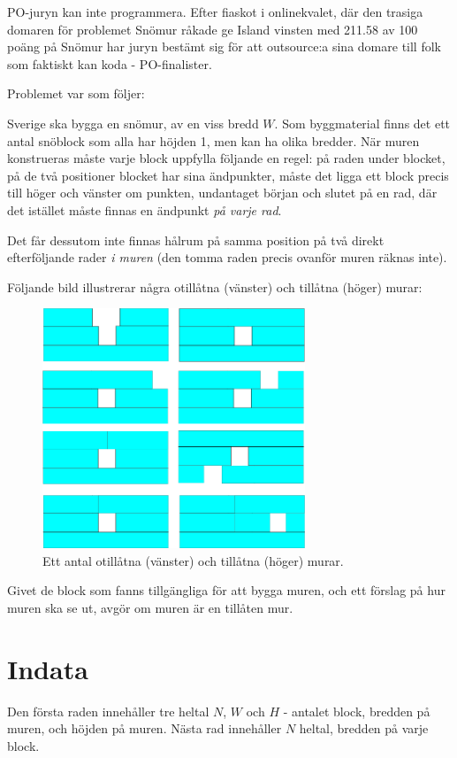 PO-juryn kan inte programmera. Efter fiaskot i onlinekvalet, där den trasiga domaren för problemet Snömur råkade ge Island vinsten med 211.58 av 100 poäng på Snömur har juryn bestämt sig för att outsource:a sina domare till folk som faktiskt kan koda - PO-finalister.

Problemet var som följer:

Sverige ska bygga en snömur, av en viss bredd $W$.
Som byggmaterial finns det ett antal snöblock som alla har höjden 1, men kan ha olika bredder.
När muren konstrueras måste varje block uppfylla följande en regel: på raden under blocket,
på de två positioner blocket har sina ändpunkter, måste det ligga ett block precis till höger och vänster om punkten,
undantaget början och slutet på en rad, där det istället måste finnas en ändpunkt \emph{på varje rad}.

Det får dessutom inte finnas hålrum på samma position på två direkt efterföljande rader \emph{i muren} (den tomma raden
precis ovanför muren räknas inte).

Följande bild illustrerar några otillåtna (vänster) och tillåtna (höger) murar:

\begin{figure}[h]
	\centering
	\includegraphics[width=0.7\textwidth]{mur.png}
	\caption{Ett antal otillåtna (vänster) och tillåtna (höger) murar.}
\end{figure}

Givet de block som fanns tillgängliga för att bygga muren, och ett förslag på hur muren ska se ut, avgör om muren är en tillåten mur.

\section*{Indata}
Den första raden innehåller tre heltal $N$, $W$ och $H$ - antalet block, bredden på muren, och höjden på muren.
Nästa rad innehåller $N$ heltal, bredden på varje block.

